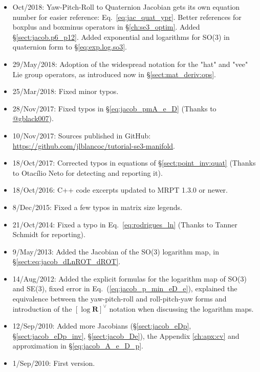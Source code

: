\documentclass[a4paper,11pt]{report}
\begin{document}
\begin{itemize}
 \item Oct/2018: Yaw-Pitch-Roll to Quaternion Jacobian gets its own equation number for easier reference: Eq.~\ref{eq:jac_quat_ypr}. Better references for boxplus and boxminus operators in \S\ref{ch:se3_optim}. Added \S\ref{sect:jacob.p6_p12}. Added exponential and logarithms for SO(3) in quaternion form to \S\ref{eq:exp.log.so3}.
	
 \item 29/May/2018: Adoption of the widespread notation for the "hat" and "vee" Lie group operators, as introduced now in \S\ref{sect:mat_deriv:ops}.

 \item 25/Mar/2018: Fixed minor typos.
  
 \item 28/Nov/2017: Fixed typos in \S\ref{eq:jacob_pmA_e_D} (Thanks to \href{https://github.com/gblack007}{@gblack007}).

 \item 10/Nov/2017: Sources published in GitHub: \\
    \url{https://github.com/jlblancoc/tutorial-se3-manifold}.

 \item 18/Oct/2017: Corrected typos in equations of \S\ref{sect:point_inv:quat} (Thanks to Otacílio Neto for detecting and reporting it).

 \item 18/Oct/2016: C++ code excerpts updated to MRPT 1.3.0 or newer.

 \item 8/Dec/2015: Fixed a few typos in matrix size legends.

 \item 21/Oct/2014: Fixed a typo in Eq.~\ref{eq:rodrigues_ln} (Thanks to Tanner Schmidt for reporting).

 \item 9/May/2013: Added the Jacobian of the SO(3) logarithm map, in \S\ref{sect:eq:jacob_dLnROT_dROT}.

 \item 14/Aug/2012: Added the explicit formulas for the logarithm map of SO(3) and SE(3),
    fixed error in Eq.~(\ref{eq:jacob_p_min_eD_e}), explained the equivalence between the yaw-pitch-roll
and roll-pitch-yaw forms and introduction of the $\left[ \log \mathbf{R} \right]^\vee$ notation
when discussing the logarithm maps.

 \item 12/Sep/2010: Added more Jacobians (\S\ref{sect:jacob_eDp},
\S\ref{sect:jacob_eDp_inv}, \S\ref{sect:jacob_De}),
         the Appendix \ref{ch:apx:cv} and approximation in \S\ref{eq:jacob_A_e_D_p}.

 \item 1/Sep/2010: First version.
\end{itemize}
\end{document}
